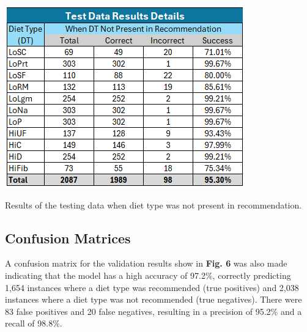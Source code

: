 \begin{table}[H]
    \centering
    \includegraphics[width=\linewidth]{Figures/tdrdn.png}
    \caption{Results of the testing data when diet type was not present in recommendation.}
\end{table}

\subsection{Confusion Matrices}
A confusion matrix for the validation results show in \textbf{Fig. 6} was also made indicating that the model has a high accuracy of 97.2\%, correctly predicting 1,654 instances where a diet type was recommended (true positives) and 2,038 instances where a diet type was not recommended (true negatives). There were 83 false positives and 20 false negatives, resulting in a precision of 95.2\% and a recall of 98.8\%.

